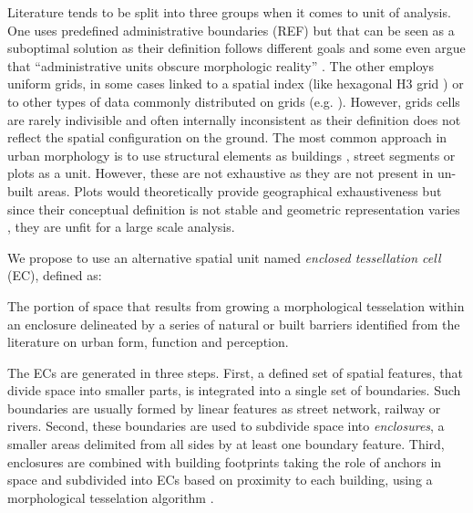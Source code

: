 Literature tends to be split into three groups when it comes to unit of analysis. One
uses predefined administrative boundaries (REF) but that can be seen as a suboptimal
solution as their definition follows different goals and some even argue that
“administrative units obscure morphologic reality” \citep{taubenbock2019new}. The other
employs uniform grids, in some cases linked to a spatial index (like hexagonal H3 grid
\citep{brodsky2018h3}) or to other types of data commonly distributed on grids (e.g.
\cite{jochem2020}). However, grids cells are rarely indivisible and often internally
inconsistent as their definition does not reflect the spatial configuration on the
ground. The most common approach in urban morphology is to use structural elements as
buildings \citep{hamaina2012a}, street segments \citep{araldi2019} or plots
\citep{berghauserpont2019a} as a unit. However, these are not exhaustive as they are not
present in un-built areas. Plots would theoretically provide geographical exhaustiveness
but since their conceptual definition is not stable and geometric representation varies
\citep{kropf2018plots}, they are unfit for a large scale analysis.

We propose to use an alternative spatial unit named \textit{enclosed tessellation cell}
(EC), defined as:

\begin{theorem}
    The portion of space that results from growing a morphological tesselation within an
enclosure delineated by a series of natural or built barriers identified from the
literature on urban form, function and perception.
\end{theorem}


The ECs are generated in three steps. First, a defined set of spatial features, that
divide space into smaller parts, is integrated into a single set of boundaries. Such
boundaries are usually formed by linear features as street network, railway or rivers.
Second, these boundaries are used to subdivide space into \textit{enclosures}, a smaller
areas delimited from all sides by at least one boundary feature. Third, enclosures are
combined with building footprints taking the role of anchors in space and subdivided
into ECs based on proximity to each building, using a morphological tesselation
algorithm \citep{fleischmann2020morphological}.


